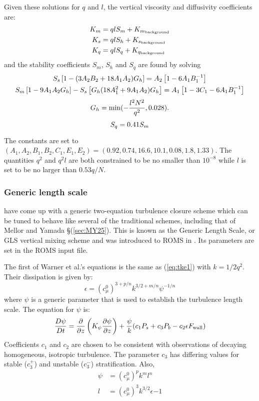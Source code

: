 Given these solutions for $q$ and $l$, the vertical viscosity and
diffusivity coefficients are:
\begin{align}
  K_m &= qlS_m + K_{m_{\rm background}} \\
  K_s &= qlS_h + K_{s_{\rm background}} \\
  K_q &= qlS_q + K_{q_{\rm background}}
\end{align}
and the stability coefficients $S_m$, $S_h$ and $S_q$ are found by
solving
\begin{gather}
  S_s \left[ 1 - (3A_2 B_2 + 18 A_1 A_2) G_h \right] =
  A_2 \left[ 1 - 6A_1 B_1^{-1} \right]
\\ \vspace{1mm}
  S_m \left[ 1 - 9A_1 A_2 G_h \right] - S_s \left[ G_h ( 18 A_1^2 +
  9A_1 A_2 ) G_h \right] =
  A_1 \left[ 1 - 3C_1 - 6A_1 B_1^{-1} \right]
\\ \vspace{1mm}
  G_h = \min ( -{l^2N^2 \over q^2}, 0.028 ).
\\ \vspace{1mm}
  S_q = 0.41 S_m
\end{gather}
The constants are set to $(A_1, A_2, B_1, B_2, C_1, E_1, E_2) = 
(0.92, 0.74, 16.6, 10.1, 0.08, 1.8, 1.33)$. The quantities $q^2$ and
$q^2l$ are both constrained to be no smaller than $10^{-8}$ while $l$
is set to be no larger than $0.53q/N$.

\subsubsection{Generic length scale}
\citep{Umlauf2003} have come up with a generic
two-equation turbulence closure scheme which can be tuned to behave
like several of the traditional schemes, including that of Mellor
and Yamada \S(\ref{sec:MY25}). This is known as the Generic Length
Scale, or GLS vertical mixing scheme and was introduced to ROMS in
\citep{Warner_2005}. Its parameters are set in the
ROMS input file.

The first of Warner et al.'s equations is the same as (\ref{eq:tke1})
with $k=1/2 q^2$. Their dissipation is given by:
\begin{equation}
  \epsilon = (c^0_\mu ) ^{3+p/n} k^{3/2+m/n} \psi ^{-1/n}
\end{equation}
where $\psi$ is a generic parameter that is used to establish the
turbulence length scale. The equation for $\psi$ is:
\begin{equation}
  {D \psi \over D t} = {\partial \over \partial z} \left( K_\psi  
  {\partial \psi \over \partial z}\right) + {\psi \over k}
  (c_1 P_s + c_3 P_b - c_2 \epsilon F_{\rm wall})
\end{equation}
Coefficients $c_1$ and $c_2$ are chosen to be consistent
with observations of decaying homogeneous, isotropic turbulence. The
parameter $c_3$ has differing values for stable ($c^+_3$) and unstable
($c^-_3$) stratification. Also,
\begin{eqnarray}
   \psi &= (c^0_\mu)^p k^m l^n \\
   l &= (c^0_\mu)^3 k^{3/2} \epsilon{-1}
\end{eqnarray}

